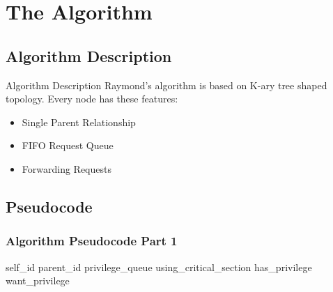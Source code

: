 \documentclass[11pt]{beamer}              %
\begin{document}
\section{The Algorithm}
\subsection{Algorithm Description}
\begin{frame}{Algorithm Description}
Raymond's algorithm is based on K-ary tree shaped topology. Every node has these features:

\begin{itemize}
    \item Single Parent Relationship
    \item FIFO Request Queue
    \item Forwarding Requests
\end{itemize}

\end{frame}


\subsection{Pseudocode}

\begin{frame}
\frametitle{Algorithm Pseudocode Part 1}

\begin{center}
\begin{algorithm}[H]
	\scriptsize
	\def\algorithmlabel{Raymond's}
    \caption{\algorithmlabel\ algorithm}
    \label{alg:raymondsalgorithm}
    \begin{algorithmic}[1]
    	\Implement {\algorithmlabel}{cf} 
    	 {self\_id} 
    	 {parent\_id} 
    	 {privilege\_queue}
    	 {using\_critical\_section}
         {has\_privilege}
         {want\_privilege}
	   \Need {}
    \end{algorithmic}
\end{algorithm}
\end{center}

\end{frame}
\end{document}
